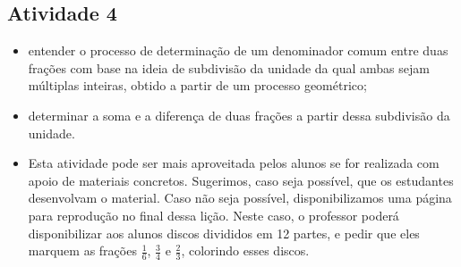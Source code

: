 \begin{multicols}{2}
\subsection{Atividade 4}

\newline \vspace{.15cm}

\begin{itemize} %
  \item      entender o processo de determinação de um denominador comum entre duas frações com base na ideia de subdivisão da unidade da qual ambas sejam múltiplas inteiras, obtido a partir de um processo geométrico;
  \item      determinar a soma e a diferença de duas frações a partir dessa subdivisão da unidade.
\end{itemize} %


 \vspace{.15cm}

\begin{itemize} %
  \item      Esta atividade pode ser mais aproveitada pelos alunos se for realizada com apoio de materiais concretos. Sugerimos, caso seja possível, que os estudantes desenvolvam o material. Caso não seja possível, disponibilizamos uma página para reprodução no final dessa lição. Neste caso, o professor poderá disponibilizar aos alunos discos divididos em 12 partes, e pedir que eles marquem as frações     $\frac{1}{6}$,     $\frac{3}{4}$     e     $\frac{2}{3}$,     colorindo esses discos.



\end{itemize}
\end{multicols}
